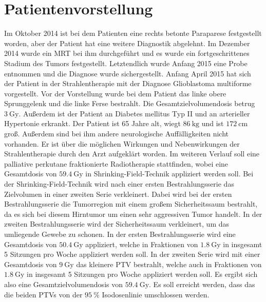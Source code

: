\section{Patientenvorstellung}
Im Oktober 2014 ist bei dem Patienten eine rechts betonte Paraparese festgestellt worden, aber der Patient hat eine weitere Diagnostik abgelehnt.
Im Dezember 2014 wurde ein MRT bei ihm durchgeführt und es wurde ein fortgeschrittenes Stadium des Tumors festgestellt.
Letztendlich wurde Anfang 2015 eine Probe entnommen und die Diagnose wurde sichergestellt.
Anfang April 2015 hat sich der Patient in der Strahlentherapie mit der Diagnose Glioblastoma multiforme vorgestellt.
Vor der Vorstellung wurde bei dem Patient das linke obere Sprunggelenk und die linke Ferse bestrahlt.
Die Gesamtzielvolumendosis betrug $\SI{3}{\gray}$. Außerdem ist der Patient an Diabetes mellitus Typ II und an arterieller Hypertonie erkrankt.
Der Patient ist 65 Jahre alt, wiegt $\SI{86}{\kilogram}$ und ist $\SI{172}{\centi\meter}$ groß.
Außerdem sind bei ihm andere neurologische Auffälligkeiten nicht vorhanden.
Er ist über die möglichen Wirkungen und Nebenwirkungen der Strahlentherapie durch den Arzt aufgeklärt worden.
Im weiteren Verlauf soll eine palliative perkutane fraktionierte Radiotherapie stattfinden, wobei eine Gesamtdosis von $\SI{59,4}{\gray}$ in
Shrinking-Field-Technik appliziert werden soll. Bei der Shrinking-Field-Technik wird nach einer ersten Bestrahlungsserie das Zielvolumen in
einer zweiten Serie verkleinert. Dabei wird bei der ersten Bestrahlungsserie die Tumorregion mit einem großem Sicherheitssaum bestrahlt, da es
sich bei diesem Hirntumor um einen sehr aggressiven Tumor handelt. In der zweiten Bestrahlungsserie wird der Sicherheitssaum verkleinert, um das
umliegende Gewebe zu schonen.
In der ersten Bestrahlungsserie wird eine Gesamtdosis von $\SI{50,4}{\gray}$ appliziert, welche in Fraktionen von $\SI{1,8}{\gray}$ in
insgesamt 5 Sitzungen pro Woche appliziert werden soll.
In der zweiten Serie wird mit einer Gesamtdosis von $\SI{9}{\gray}$ das kleinere PTV bestrahlt, welche auch in Fraktionen von $\SI{1,8}{\gray}$ in insgesamt
5 Sitzungen pro Woche appliziert werden soll. Es ergibt sich also eine Gesamtzielvolumendosis von  $\SI{59,4}{\gray}$.
Es soll erreicht werden, dass das die beiden PTVs von der $\SI{95}{\percent}$ Isodosenlinie umschlossen werden.
